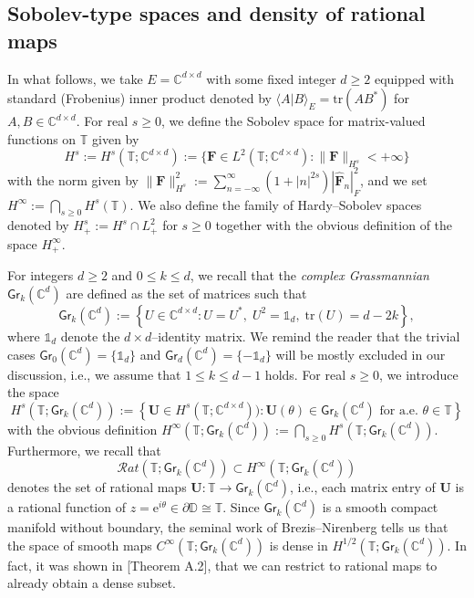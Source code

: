 \documentclass[10pt,reqno,a4paper]{amsart}
\theoremstyle{definition}
\theoremstyle{remark}
\theoremstyle{remark}
\numberwithin{equation}{section}
\newcommand{\C}{\mathbb{C}}
\newcommand{\T}{\mathbb{T}}
\newcommand{\D}{\mathbb{D}}
\newcommand{\ov}{\overline}
\newcommand{\pt}{\partial}
\newcommand{\eu}{\mathrm{e}}
\newcommand{\Ub}{\mathbf{U}}
\newcommand{\Fb}{\mathbf{F}}
\newcommand{\tr}{\mathrm{tr}}
\newcommand{\Gr}{\mathsf{Gr}}
\begin{document}
\subsection{Sobolev-type spaces and density of rational maps}
In what follows, we take $E= \C^{d \times d}$ with some fixed integer $d \geq 2$ equipped with standard (Frobenius) inner product denoted by $\langle A|B \rangle_E= \tr(A B^*)$ for $A,B \in \C^{d \times d}$.  For real $s \geq 0$, we define the Sobolev space for matrix-valued functions on $\T$ given by
$$
H^s := H^s(\T; \C^{d \times d}) := \{ \Fb \in L^2(\T; \C^{d \times d}) : \| \Fb\|_{H^s} < +\infty \} 
$$
with the norm given by $\| \Fb \|_{H^s}^2 := \sum_{n=-\infty}^{\infty} (1+|n|^{2s}) |\widehat{\Fb}_n|^2_F$, and we set $H^\infty := \bigcap_{s \geq 0} H^s(\T)$. We also define the family of Hardy--Sobolev spaces denoted by $H^s_+ := H^s \cap L^2_+$ for $s \geq 0$ together with the obvious definition of the space $H^\infty_+$.


For integers $d \geq 2$ and $0 \leq k \leq d$, we recall that the {\em complex Grassmannian} $\Gr_k(\C^d)$ are defined as the set of matrices such that
$$
\Gr_k(\C^d) := \left \{ U \in \C^{d \times d} : U = U^*, \; U^2 =\mathds{1}_d, \; \tr(U) = d-2k \right \},
$$
where $\mathds{1}_d$ denote the $d\times d$--identity matrix. We remind the reader that the trivial cases $\Gr_0(\C^d) = \{ \mathds{1}_d \}$ and $\Gr_d(\C^d) = \{ -\mathds{1}_d \}$ will be mostly excluded in our discussion, i.e., we assume that $1 \leq k \leq d-1$ holds. For real $s \geq 0$, we introduce the space
$$
H^{s}(\T; \Gr_k(\C^d)) := \left \{ \Ub \in H^{s}(\T; \C^{d \times d})) : \mbox{$\Ub(\theta) \in \Gr_k(\C^d)$ for a.e.~$\theta \in \T$} \right \}
$$
with the obvious definition $H^\infty(\T; \Gr_k(\C^d)) := \bigcap_{s \geq 0} H^s(\T; \Gr_k(\C^d))$. Furthermore, we recall that
$$
\mathcal{R}at(\T; \Gr_k(\C^d)) \subset H^\infty(\T; \Gr_k(\C^d))
$$ 
denotes the set of rational maps $\Ub : \T \to \Gr_k(\C^d)$, i.e., each matrix entry of $\Ub$ is a rational function of $z = \eu^{i \theta} \in \pt \D \cong \T$. Since $\Gr_k(\C^d)$ is a smooth compact manifold without boundary, the seminal work of Brezis--Nirenberg \cite{BrNi-95} tells us that the space of smooth maps $C^\infty(\T; \Gr_k(\C^d))$ is dense in $H^{1/2}(\T; \Gr_k(\C^d))$. In fact, it was shown in \cite{GeLe-25}[Theorem A.2], that we can restrict to rational maps to already obtain a dense subset. 
\end{document}

